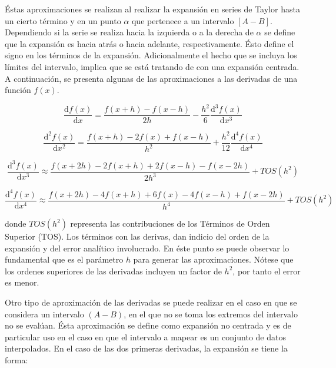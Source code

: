 \documentclass[letterpaper,10pt,oneside]{sphinxmanual}
\theoremstyle{plain}%
\theoremstyle{definition}%
\theoremstyle{remark}%
\begin{document}
Éstas aproximaciones se realizan al realizar la expansión en series de Taylor hasta un cierto término y en un punto $\alpha$ que pertenece a un intervalo $[A-B]$. Dependiendo si la serie se realiza hacia la izquierda o a la derecha de $\alpha$ se define que la expansión es hacia atrás o hacia adelante, respectivamente. Ésto define el signo en los términos de la expansión. Adicionalmente el hecho que se incluya los límites del intervalo, implica que se está tratando de con una expansión centrada. A continuación, se presenta algunas de las aproximaciones a las derivadas de una función $f(x)$.

\begin{equation}
\frac{\mathrm{d}f(x)}{\mathrm{d}x} = \frac{f(x + h) - f(x -h)}{2h} - \frac{h^2}{6}\frac{\mathrm{d}^{3}f(x)}{\mathrm{d}x^{3}}
\end{equation}

\begin{equation}
\frac{\mathrm{d}^{2}f(x)}{\mathrm{d}x^{2}} = \frac{f(x + h) - 2f(x) + f(x - h)}{h^2} + \frac{h^2}{12}\frac{\mathrm{d}^{4}f(x)}{\mathrm{d}x^{4}}
\end{equation}

\begin{equation}
\frac{\mathrm{d}^{3}f(x)}{\mathrm{d}x^{3}} \approx \frac{f(x + 2h) - 2f(x + h) + 2f(x - h) - f(x - 2h)}{2h^3} + TOS(h^2)
\end{equation}

\begin{equation}
\frac{\mathrm{d}^{4}f(x)}{\mathrm{d}x^{4}} \approx \frac{f(x + 2h) - 4f(x + h) + 6f(x) - 4f(x - h) + f(x - 2h)}{h^4} + TOS(h^2)
\end{equation}

donde $TOS(h^2)$ representa las contribuciones de los Términos de Orden Superior (TOS). Los términos con las derivas, dan indicio del orden de la expansión y del error analítico involucrado. En éste punto se puede observar lo fundamental que es el parámetro $h$ para generar las aproximaciones. Nótese que los ordenes superiores de las derivadas incluyen un factor de $h^2$, por tanto el error es menor.

Otro tipo de aproximación de las derivadas se puede realizar en el caso en que se considera un intervalo $(A-B)$, en el que no se toma los extremos del intervalo no se evalúan. Ésta aproximación se define como expansión no centrada y es de particular uso en el caso en que el intervalo a mapear es un conjunto de datos interpolados. En el caso de las dos primeras derivadas, la expansión se tiene la forma:
\end{document}

